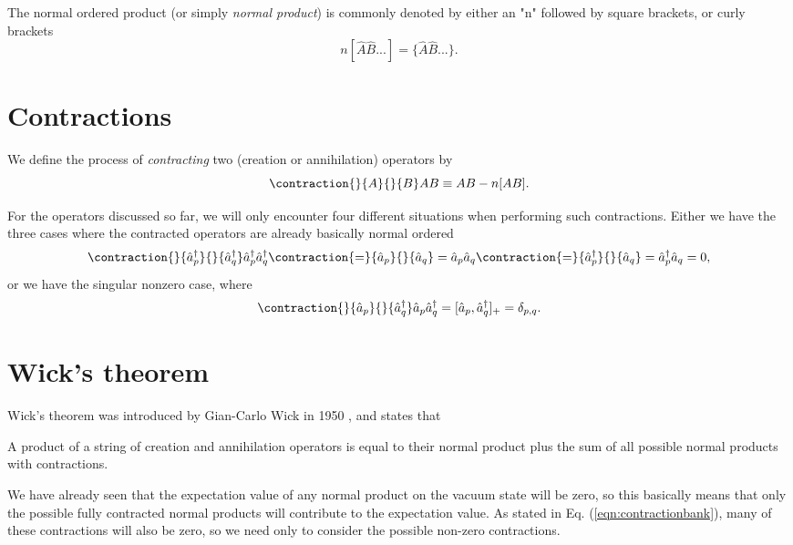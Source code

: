 The normal ordered product (or simply \emph{normal product}) is commonly denoted by either an "n" followed by square brackets, or curly brackets \cite{ShavittBartlett2009}
\begin{equation}
n[\hat{A} \hat{B} ...] = \{\hat{A} \hat{B}...  \}.
\label{eqn:2nq_hamiltonian}
\end{equation}

\section{Contractions}

We define the process of \emph{contracting} two (creation or annihilation) operators by
\begin{equation}
\contraction{}{A}{}{B}
AB \equiv AB - n[AB].
\label{eqn:contractiondef}
\end{equation}

For the operators discussed so far, we will only encounter four different situations when performing such contractions. Either we have the three cases where the contracted operators are already basically normal ordered
\begin{equation}
\contraction{}{\hat{a}_p^\dagger}{}{\hat{a}_q^\dagger}
\hat{a}_p^\dagger \hat{a}_q^\dagger 
\contraction{=}{\hat{a}_p}{}{\hat{a}_q}
= \hat{a}_p \hat{a}_q
\contraction{=}{\hat{a}_p^\dagger}{}{\hat{a}_q}
 = \hat{a}_p^\dagger \hat{a}_q = 0,
\label{eqn:contractionbank}
\end{equation}
or we have the singular nonzero case, where
\begin{equation}
\contraction{}{\hat{a}_p}{}{\hat{a}_q^\dagger}
\hat{a}_p \hat{a}_q^\dagger = [\hat{a}_p, \hat{a}_q^\dagger]_+ = \delta_{p,q}.
\label{eqn:contractionbank2}
\end{equation}

\section{Wick's theorem}

Wick's theorem was introduced by Gian-Carlo Wick in 1950 \cite{Wick1950}, and states that 

\begin{theorem}
A product of a string of creation and annihilation operators is equal to their normal product plus the sum of all possible normal products with contractions.
\end{theorem}

We have already seen that the expectation value of any normal product
on the vacuum state will be zero, so this basically means that only
the possible fully contracted normal products will contribute to the
expectation value. As stated in Eq. (\ref{eqn:contractionbank}), many of
these contractions will also be zero, so we need only to consider the
possible non-zero contractions.

